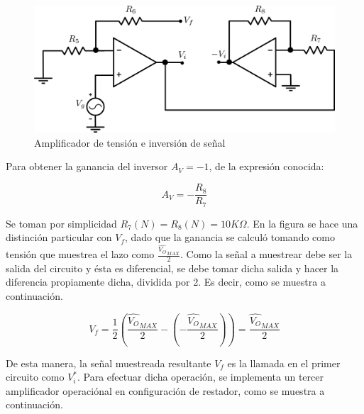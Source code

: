 \begin{figure}[!ht]
\begin{centering}
\includegraphics[scale=0.5]{Imagenes/opamp2SinCap.png}
\par\end{centering}
\caption{Amplificador de tensión e inversión de señal}
\end{figure}

Para obtener la ganancia del inversor $A_V = -1$, de la expresión conocida:

\[
A_V = -\frac{R_8}{R_7}
\]

Se toman por simplicidad $R_7(N) = R_8(N) = 10K\Omega$.
En la figura se hace una distinción particular con $V_f$, dado que la ganancia se calculó tomando como tensión que muestrea el lazo como $\frac{\hat{V_O}_{MAX}}{2}$. Como la señal a muestrear debe ser la salida del circuito y ésta es diferencial, se debe tomar dicha salida y hacer la diferencia propiamente dicha, dividida por 2. Es decir, como se muestra a continuación.

\[
V_f = \frac{1}{2}\left( \frac{\hat{V_O}_{MAX}}{2} - \left( -\frac{\hat{V_O}_{MAX}}{2} \right) \right) = \frac{\hat{V_O}_{MAX}}{2}
\]

De esta manera, la señal muestreada resultante $V_f$ es la llamada en el primer circuito como $V_i^*$. Para efectuar dicha operación, se implementa un tercer amplificador operaciónal en configuración de restador, como se muestra a continuación.

